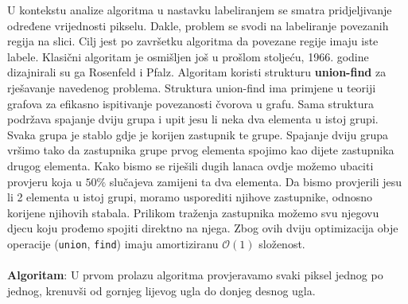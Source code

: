 \documentclass[times, utf8, diplomski]{fer}
\theoremstyle{definition}
\begin{document}
U kontekstu analize algoritma u nastavku labeliranjem se smatra pridjeljivanje određene vrijednosti pikselu. Dakle, problem se svodi na labeliranje povezanih regija na slici. Cilj jest po završetku algoritma da povezane regije imaju iste labele. Klasični algoritam je osmišljen još u prošlom stoljeću, 1966. godine dizajnirali su ga Rosenfeld i Pfalz. Algoritam koristi strukturu \textbf{union-find} za rješavanje navedenog problema. Struktura union-find ima primjene u teoriji grafova za efikasno ispitivanje povezanosti čvorova u grafu. Sama struktura podržava spajanje dviju grupa i upit jesu li neka dva elementa u istoj grupi. Svaka grupa je stablo gdje je korijen zastupnik te grupe. Spajanje dviju grupa vršimo tako da zastupnika grupe prvog elementa spojimo kao dijete zastupnika drugog elementa. Kako bismo se riješili dugih lanaca ovdje možemo ubaciti provjeru koja u $50\%$ slučajeva zamijeni ta dva elementa. Da bismo provjerili jesu li 2 elementa u istoj grupi, moramo usporediti njihove zastupnike, odnosno korijene njihovih stabala. Prilikom traženja zastupnika možemo svu njegovu djecu koju prođemo spojiti direktno na njega. Zbog ovih dviju optimizacija obje operacije (\texttt{union}, \texttt{find}) imaju amortiziranu $\mathcal{O}(1)$ složenost.
\\
\\
\textbf{Algoritam}:
U prvom prolazu algoritma provjeravamo svaki piksel jednog po jednog, krenuvši od gornjeg lijevog ugla do donjeg desnog ugla.
\end{document}
